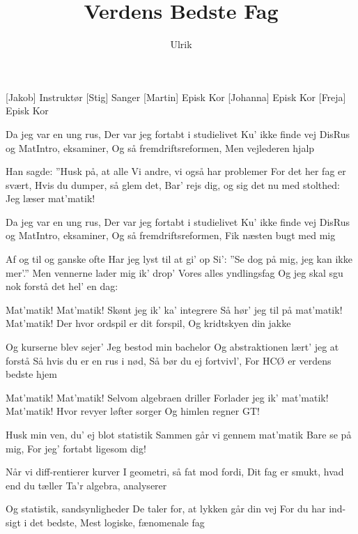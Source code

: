 \documentclass[a4paper,11pt]{article}
\title{Verdens Bedste Fag}
\author{Ulrik}
\begin{document}
\maketitle

\begin{roles}
[Jakob] Instruktør
[Stig] Sanger
[Martin] Episk Kor
[Johanna] Episk Kor
[Freja] Episk Kor
\end{roles}

\begin{song}


 Da jeg var en ung rus,
Der var jeg fortabt i studielivet
Ku’ ikke finde vej
DisRus og MatIntro, eksaminer,
Og så fremdriftsreformen,
Men vejlederen hjalp
 
 Han sagde: ”Husk på, at alle
Vi andre, vi også har problemer
For det her fag er svært,
Hvis du dumper, så glem det,
Bar’ rejs dig, og sig det nu med stolthed:
Jeg læser mat’matik!
 
 Da jeg var en ung rus,
Der var jeg fortabt i studielivet
Ku’ ikke finde vej
DisRus og MatIntro, eksaminer,
Og så fremdriftsreformen,
Fik næsten bugt med mig
 
 Af og til og ganske ofte
Har jeg lyst til at gi’ op
Si’: ”Se dog på mig, jeg kan ikke mer’.”
Men vennerne lader mig ik’ drop’
Vores alles yndlingsfag
Og jeg skal sgu nok forstå det hel’ en dag:
 
 Mat’matik! Mat’matik!
Skønt jeg ik’ ka’ integrere
Så hør’ jeg til på mat’matik! Mat’matik!
Der hvor ordspil er dit forspil,
Og kridtskyen din jakke
 
 Og kurserne blev sejer’
Jeg bestod min bachelor
Og abstraktionen lært’ jeg at forstå
Så hvis du er en rus i nød,
Så bør du ej fortvivl’,
For HCØ er verdens bedste hjem
 
 Mat’matik! Mat’matik!
Selvom algebraen driller
Forlader jeg ik’ mat’matik! Mat’matik!
Hvor revyer løfter sorger
Og himlen regner GT!
 
 Husk min ven, du’ ej blot statistik
Sammen går vi gennem mat’matik
Bare se på mig,
For jeg’ fortabt ligesom dig!
 
 Når vi diff-rentierer kurver
I geometri, så fat mod fordi,
Dit fag er smukt, hvad end du tæller
Ta’r algebra, analyserer
 
 Og statistik, sandsynligheder
De taler for, at lykken går din vej
For du har ind-sigt i det bedste,
Mest logiske, fænomenale fag
 

\end{song}
\end{document}
